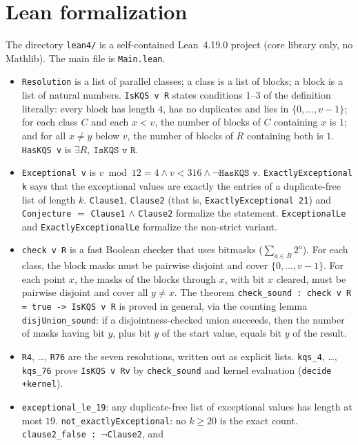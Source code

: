 \documentclass[11pt]{article}
\theoremstyle{definition}
\theoremstyle{remark}
\begin{document}
\section{Lean formalization}
The directory \texttt{lean4/} is a self-contained Lean~4.19.0 project (core library only, no
Mathlib). The main file is \texttt{Main.lean}.
\begin{itemize}
\item \texttt{Resolution} is a list of parallel classes; a class is a list of blocks; a block
is a list of natural numbers. \texttt{IsKQS v R} states conditions 1--3 of the definition
literally: every block has length $4$, has no duplicates and lies in $\{0,\dots,v-1\}$; for
each class $C$ and each $x<v$, the number of blocks of $C$ containing $x$ is $1$; and for all
$x\ne y$ below $v$, the number of blocks of $R$ containing both is $1$.
\texttt{HasKQS v} is $\exists R,\ \texttt{IsKQS v R}$.
\item \texttt{Exceptional v} is $v\bmod 12=4\wedge v<316\wedge\neg\texttt{HasKQS v}$.
\texttt{ExactlyExceptional k} says that the exceptional values are exactly the entries of a
duplicate-free list of length $k$. \texttt{Clause1}, \texttt{Clause2} (that is,
\texttt{ExactlyExceptional 21}) and \texttt{Conjecture} $=$ \texttt{Clause1} $\wedge$
\texttt{Clause2} formalize the statement. \texttt{ExceptionalLe} and
\texttt{ExactlyExceptionalLe} formalize the non-strict variant.
\item \texttt{check v R} is a fast Boolean checker that uses bitmasks
($\sum_{a\in B}2^a$). For each class, the block masks must be pairwise disjoint and cover
$\{0,\dots,v-1\}$. For each point $x$, the masks of the blocks through $x$, with bit $x$
cleared, must be pairwise disjoint and cover all $y\ne x$. The theorem
\texttt{check\_sound : check v R = true -> IsKQS v R} is proved in general, via the counting
lemma \texttt{disjUnion\_sound}: if a disjointness-checked union succeeds, then the number of
masks having bit $y$, plus bit $y$ of the start value, equals bit $y$ of the result.
\item \texttt{R4}, \dots, \texttt{R76} are the seven resolutions, written out as explicit lists.
\texttt{kqs\_4}, \dots, \texttt{kqs\_76} prove \texttt{IsKQS v Rv} by
\texttt{check\_sound} and kernel evaluation (\texttt{decide +kernel}).
\item \texttt{exceptional\_le\_19}: any duplicate-free list of exceptional values has length at
most $19$. \texttt{not\_exactlyExceptional}: no $k\ge20$ is the exact count.
\texttt{clause2\_false : }$\neg$\texttt{Clause2}, and

\end{itemize}
\end{document}
